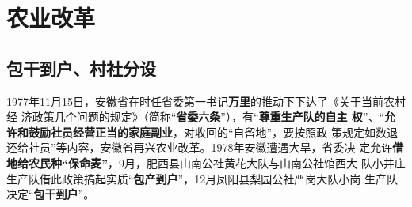







\section{农业改革}

\subsection{包干到户、村社分设}

1977年11月15日，安徽省在时任省委第一书记\textbf{万里}的推动下下达了《关于当前农村经
济政策几个问题的规定》（简称“\textbf{省委六条}”），有“\textbf{尊重生产队的自主
  权}”、“\textbf{允许和鼓励社员经营正当的家庭副业}，对收回的“自留地”，要按照政
策规定如数退还给社员”等内容，安徽省再兴农业改革。1978年安徽遭遇大旱，省委决
定允许\textbf{借地给农民种“保命麦”}，9月，肥西县山南公社黄花大队与山南公社馆西大
队小井庄生产队借此政策搞起实质“\textbf{包产到户}”，12月凤阳县梨园公社严岗大队小岗
生产队决定“\textbf{包干到户}”。

